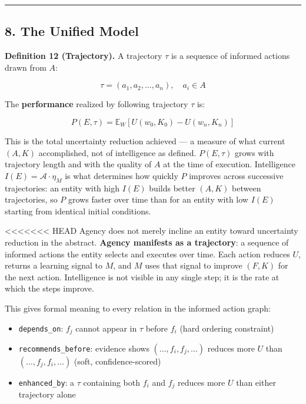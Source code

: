 \documentclass[
]{article}
\providecommand{\tightlist}{%
  \setlength{\itemsep}{0pt}\setlength{\parskip}{0pt}}
\begin{document}
\begin{center}\rule{0.5\linewidth}{0.5pt}\end{center}

\subsection{8. The Unified Model}\label{the-unified-model}

\textbf{Definition 12 (Trajectory).} A trajectory \(\tau\) is a sequence
of informed actions drawn from \(A\):

\[\tau = (a_1, a_2, \ldots, a_n), \quad a_i \in A\]

The \textbf{performance} realized by following trajectory \(\tau\) is:

\[P(E, \tau) = \mathbb{E}_W\left[U(w_0, K_0) - U(w_n, K_n)\right]\]

This is the total uncertainty reduction achieved --- a measure of what
current \((A, K)\) accomplished, not of intelligence as defined.
\(P(E, \tau)\) grows with trajectory length and with the quality of
\(A\) at the time of execution. Intelligence \(I(E) = \mathcal{A}
\cdot \eta_M\) is what determines how quickly \(P\) improves across
successive trajectories: an entity with high \(I(E)\) builds better
\((A, K)\) between trajectories, so \(P\) grows faster over time than
for an entity with low \(I(E)\) starting from identical initial
conditions.

<<<<<<< HEAD
Agency does not merely incline an entity toward uncertainty reduction in
the abstract. \textbf{Agency manifests as a trajectory}: a sequence of
informed actions the entity selects and executes over time. Each action
reduces \(U\), returns a learning signal to \(M\), and \(M\) uses that
signal to improve \((F, K)\) for the next action. Intelligence is not
visible in any single step; it is the rate at which the steps improve.

This gives formal meaning to every relation in the informed action
graph:

\begin{itemize}
\tightlist
\item
  \texttt{depends\_on}: \(f_j\) cannot appear in \(\tau\) before \(f_i\)
  (hard ordering constraint)
\item
  \texttt{recommends\_before}: evidence shows
  \((\ldots, f_i, f_j, \ldots)\) reduces more \(U\) than
  \((\ldots, f_j, f_i, \ldots)\) (soft, confidence-scored)
\item
  \texttt{enhanced\_by}: a \(\tau\) containing both \(f_i\) and \(f_j\)
  reduces more \(U\) than either trajectory alone
\end{itemize}
\end{document}
